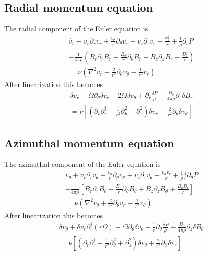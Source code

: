 \documentclass[letterpaper]{article}
\begin{document}
\subsection{Radial momentum equation}

The radial component of the Euler equation is
\begin{align}
\dot{v_r} + v_r \partial_r v_r + \frac{v_\theta}{r}\partial_\theta v_r
 + v_z \partial_z v_r - \frac{v_\theta^2}{r}+\frac{1}{\rho}\partial_r P 
\nonumber \\
- \frac{1}{4\pi\rho}\left(B_r \partial_r B_r
 + \frac{B_\theta}{r}\partial_\theta B_r + B_z \partial_z B_r
 - \frac{B_\theta^2}{r}\right)
\nonumber \\
= \nu\left(\nabla^2 v_r -\frac{2}{r^2}\partial_\theta v_\theta
 - \frac{1}{r^2}v_r\right)
\end{align}
After linearization this becomes
\begin{align}
\delta\dot{v_r} + \Omega \partial_\theta \delta v_r - 2\Omega\delta v_\theta
 + \partial_r \frac{\delta P}{\rho}
 - \frac{B_0}{4\pi\rho}\partial_z \delta B_r
\nonumber \\
= \nu \left[\left(\partial_r \partial_r^\dagger
 + \frac{1}{r^2}\partial_\theta^2 + \partial_z^2\right)\delta v_r
 - \frac{2}{r^2}\partial_\theta \delta v_\theta\right]
\end{align}

\subsection{Azimuthal momentum equation}
The azimuthal component of the Euler equation is
\begin{align}
\dot{v_\theta} + v_r \partial_r v_\theta
 + \frac{v_\theta}{r}\partial_\theta v_\theta + v_z \partial_z v_\theta
 + \frac{v_\theta v_r}{r} + \frac{1}{\rho}\frac{1}{r}\partial_\theta P 
\nonumber \\
-\frac{1}{4\pi\rho}\left[B_r\partial_r B_\theta
 + \frac{B_\theta}{r}\partial_\theta B_\theta + B_z \partial_z B_\theta
 + \frac{B_\theta B_r}{r}\right]
\nonumber \\
= \nu\left(\nabla^2 v_\theta + \frac{2}{r^2}\partial_\theta v_r
 - \frac{1}{r^2}v_\theta \right)
\end{align}
After linearization this becomes
\begin{align}
\delta \dot{v_\theta} + \delta v_r \partial_r^\dagger(r\Omega)
 + \Omega \partial_\theta \delta v_\theta
 + \frac{1}{r}\partial_\theta \frac{\delta P}{\rho}
 - \frac{B_0}{4\pi\rho} \partial_z \delta B_\theta
\nonumber \\
= \nu\left[\left(\partial_r \partial_r^\dagger
 + \frac{1}{r^2}\partial_\theta^2 + \partial_z^2\right)\delta v_\theta
 + \frac{2}{r^2}\partial_\theta \delta v_r \right]
\end{align}
\end{document}
